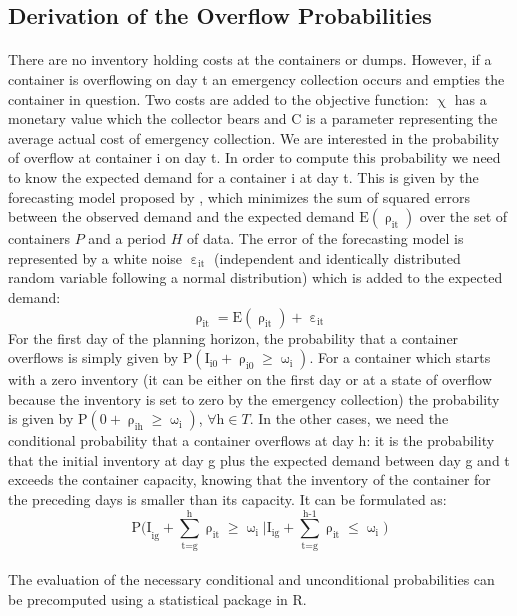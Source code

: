 \documentclass[12pt,a4paper]{article}
\begin{document}
\subsection{Derivation of the Overflow Probabilities}
\paragraph{}
There are no inventory holding costs at the containers or dumps. However, if a container is overflowing on day t an emergency collection occurs and empties the container in question. Two costs are added to the objective function: $\upchi$ has a monetary value which the collector bears and C is a parameter representing the average actual cost of emergency collection. We are interested in the probability of overflow at container i on day t. In order to compute this probability we need to know the expected demand for a container i at day t. This is given by the forecasting model proposed by \cite{Markov2016}, which minimizes the sum of squared errors between the observed demand and the expected demand $\text{E}(\uprho_{\text{it}})$ over the set of containers $P$ and a period $H$ of data. The error of the forecasting model is represented by a white noise $\upepsilon_{\text{it}}$ (independent and identically distributed random variable following a normal distribution) which is added to the expected demand:
$$\uprho_{\text{it}} = \text{E}(\uprho_{\text{it}}) + \upepsilon_{\text{it}}$$
For the first day of the planning horizon, the probability that a container overflows is simply given by P$(\text{I}_{\text{i0}}+\uprho_{\text{i0}}\geq\upomega_{\text{i}})$. For a container which starts with a zero inventory (it can be either on the first day or at a state of overflow because the inventory is set to zero by the emergency collection) the probability is given by P$(\text{0}+\uprho_{\text{ih}}\geq\upomega_{\text{i}})$, $\forall\text{h} \in T$. In the other cases, we need the conditional probability that a container overflows at day h: it is the probability that the initial inventory at day g plus the expected demand between day g and t exceeds the container capacity, knowing that the inventory of the container for the preceding days is smaller than its capacity. It can be formulated as:
 $$\text{P(I}_{\text{ig}} + \sum_{\text{t=g}}^{\text{h}}\uprho_{\text{it}} \geq \upomega_{\text{i}} | \text{I}_{\text{ig}} + \sum_{\text{t=g}}^{\text{h-1}}\uprho_{\text{it}} \le \upomega_{\text{i}} )$$ 
\paragraph{}
The evaluation of the necessary conditional and unconditional probabilities can be precomputed using a statistical package in R.
\end{document}
